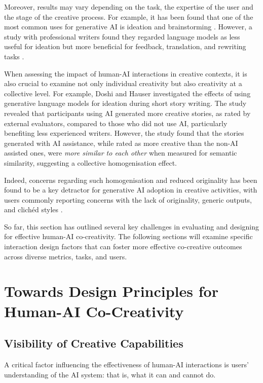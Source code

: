 Moreover, results may vary depending on the task, the expertise of the user and the stage of the creative process. For example, it has been found that one of the most common uses for generative AI is ideation and brainstorming \cite{Zao-Sanders2024-qo}. However, a study with professional writers found they regarded language models as less useful for ideation but more beneficial for feedback, translation, and rewriting tasks \cite{Chakrabarty2024-ov}.

When assessing the impact of human-AI interactions in creative contexts, it is also crucial to examine not only individual creativity but also creativity at a collective level. For example, Doshi and Hauser \cite{Doshi2023-dv} investigated the effects of using generative language models for ideation during short story writing. The study revealed that participants using AI generated more creative stories, as rated by external evaluators, compared to those who did not use AI, particularly benefiting less experienced writers. However, the study found that the stories generated with AI assistance, while rated as more creative than the non-AI assisted ones, were \textit{more similar to each other} when measured for semantic similarity, suggesting a collective homogenisation effect.

Indeed, concerns regarding such homogenisation and reduced originality has been found to be a key detractor for generative AI adoption in creative activities, with users commonly reporting concerns with the lack of originality, generic outputs, and clichéd styles \cite{Chakrabarty2024-ov, Chang2023-tv, Clark1998-yi, Ippolito2022-mf, Li2024-yh}.

So far, this section has outlined several key challenges in evaluating and designing for effective human-AI co-creativity. The following sections will examine specific interaction design factors that can foster more effective co-creative outcomes across diverse metrics, tasks, and users. 

\section{Towards Design Principles for Human-AI Co-Creativity}

\subsection{Visibility of Creative Capabilities}

A critical factor influencing the effectiveness of human-AI interactions is users' understanding of the AI system: that is, what it can and cannot do.

